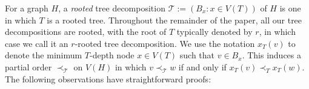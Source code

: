 \documentclass[kpfonts]{patmorin}
\DeclareMathOperator{\pw}{pw}
\theoremstyle{named}
\begin{document}
% 
% 
% 



For a graph $H$, a \emph{rooted} tree decomposition $\mathcal{T}:=(B_x:x\in V(T))$ of $H$ is one in which $T$ is a rooted tree.  Throughout the remainder of the paper, all our tree decompositions are rooted, with the root of $T$ typically denoted by $r$, in which case we call it an $r$-rooted tree decomposition.  We use the notation $x_T(v)$ to denote the minimum $T$-depth node $x\in V(T)$ such that $v\in B_x$.  This induces a partial order $\prec_{\mathcal{T}}$ on $V(H)$ in which $v\prec_{\mathcal{T}} w$ if and only if $x_T(v)\prec_T x_T(w)$.  The following observations have straightforward proofs:
\end{document}
